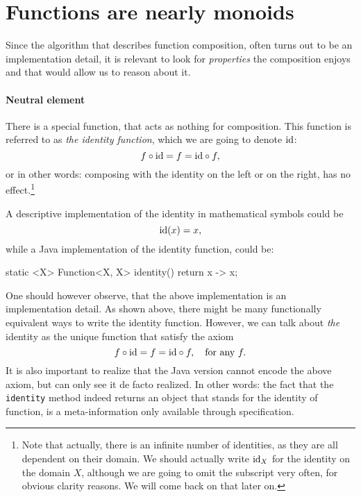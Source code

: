 \documentclass[12pt,a4paper]{report}
\renewcommand{\baselinestretch}{1.5}
\theoremstyle{theorem}
\theoremstyle{definition}
\begin{document}
\section{Functions are nearly monoids}

Since the algorithm that describes function composition, often turns out
to be an
implementation detail, it is relevant to look for \emph{properties}
the composition enjoys and that would allow us to reason about it.

\paragraph*{Neutral element}
There is a special function, that acts as nothing for composition.
This function is referred to as \emph{the identity function},
which we are going to denote ${\rm id}$:
	\[ f\circ {\rm id} = f = {\rm id} \circ f ,\]
or in other words: composing with the identity on the left or on the
right, has no effect.\footnote{Note that actually,
there is an infinite number of identities, as
they are all dependent on their domain. We should actually write
${\rm id}_X$ for the identity on the domain $X$, although we are going to
omit the subscript very often, for obvious clarity reasons.
We will come back on that later on.}

A descriptive implementation of the identity in mathematical symbols could be
	\[ {\rm id}(x) = x ,\]
while a Java implementation of the identity function, could be:

\renewcommand{\baselinestretch}{1} 
\selectfont

\begin{javacode}
static <X> Function<X, X> identity()
  { return x -> x; }
\end{javacode}

\renewcommand{\baselinestretch}{1.5} 
\selectfont

One should however observe, that the above implementation
is an implementation detail. As shown above, there might be many
functionally equivalent ways to write the identity function.
However, we can talk about \emph{the} identity as
the unique function that satisfy the axiom
	\[ f\circ {\rm id} = f = {\rm id} \circ f ,
		\quad \textrm{for any}\ f .\]
It is also important to realize
that the Java version cannot encode the above axiom,
but can only see it de facto realized. In other words: the fact that the
\lstinline{identity}{} method indeed returns an object that stands for the
identity of function, is a meta-information only available through
specification.
\end{document}
